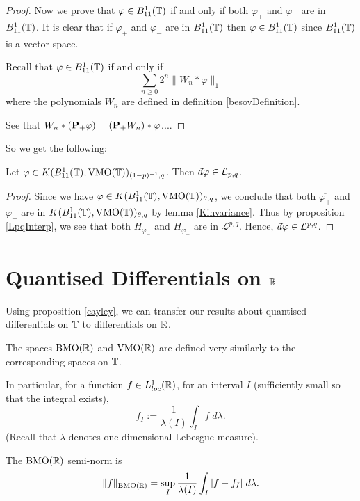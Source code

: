 \begin{proof}
    Now we prove that $\varphi \in B_{11}^1(\mathbb{T})$ if and only if both
    $\varphi_+$ and $\varphi_-$ are in $B_{11}^1(\mathbb{T})$. It is clear
    that if $\varphi_+$ and $\varphi_-$ are in $B_{11}^1(\mathbb{T})$ 
    then $\varphi \in B_{11}^1(\mathbb{T})$ since $B_{11}^1(\mathbb{T})$ is a vector space.
    
    Recall that $\varphi \in B_{11}^1(\mathbb{T})$ if and only if 
    \begin{equation}
        \sum_{n \geq 0} 2^n \|W_n*\varphi\|_1
    \end{equation}
    where the polynomials $W_n$ are defined in definition \ref{besovDefinition}.
    
    See that $W_n*(\mathbf{P}_+\varphi) = (\mathbf{P}_+W_n)*\varphi$....
\end{proof}
    
So we get the following:
\begin{corollary}
    Let $\varphi\in K(B_{11}^1(\mathbb{T}),\operatorname{VMO}(\mathbb{T}))_{(1-p)^{-1},q}$. Then $\qd \varphi \in \mathcal{L}_{p,q}$. 
\end{corollary}
\begin{proof}
    Since we have $\varphi \in K(B_{11}^1(\mathbb{T}),\operatorname{VMO}(\mathbb{T}))_{\theta,q}$, we
    conclude that both $\overline{\varphi_+}$ and $\varphi_-$
    are in $K(B_{11}^1(\mathbb{T}),\operatorname{VMO}(\mathbb{T}))_{\theta,q}$ by lemma \ref{Kinvariance}.
    Thus by proposition \ref{LpqInterp}, we see that both $H_{\varphi_-}$
    and $H_{\overline{\varphi_+}}$ are in $\mathcal{L}^{p,q}$.
    Hence, $\qd \varphi \in \mathcal{L}^{p,q}$.
\end{proof}

\section{Quantised Differentials on $\mathbb{R}$}
Using proposition \ref{cayley}, we can transfer our results
about quantised differentials on $\mathbb{T}$ to differentials on $\mathbb{R}$.

\begin{definition}
    The spaces $\operatorname{BMO}(\mathbb{R})$ and $\operatorname{VMO}(\mathbb{R})$ are defined
    very similarly to the corresponding spaces on $\mathbb{T}$. 
    
    In particular, for a function $f \in L^1_{loc}(\mathbb{R})$, for
    an interval $I$ (sufficiently small so that the integral exists),
    \begin{equation}
        f_I := \frac{1}{\lambda(I)}\int_I f\;d\lambda.
    \end{equation}
    (Recall that $\lambda$ denotes one dimensional Lebesgue measure).
    
    The $\operatorname{BMO}(\mathbb{R})$ semi-norm is
    \begin{equation}
        \|f\|_{\operatorname{BMO}(\mathbb{R})} = \sup_{I} \frac{1}{\lambda(I)}\int_I |f-f_I|\;d\lambda.
    \end{equation}
\end{definition}

